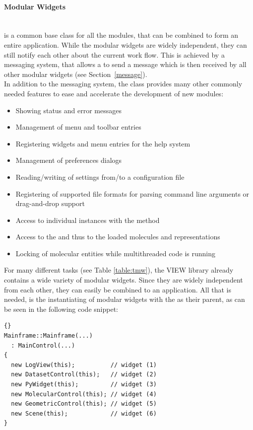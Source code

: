 \paragraph{Modular Widgets}
\hspace*{\fill}\\
 is a common base class for all the modules, that can be
combined to form an entire application. While the modular widgets are widely 
independent, they can still notify each other about the current work flow. 
This is achieved by a messaging system, that allows a 
to send a message which is then received by all other modular widgets (see 
Section~\ref{message}).
\\
In addition to the messaging system, the  class provides 
many other commonly needed features to ease and accelerate the development of
new modules:
\begin{itemize}
  \item Showing status and error messages
  \item Management of menu and toolbar entries 
  \item Registering widgets and menu entries for the help system
  \item Management of preferences dialogs
  \item Reading/writing of settings from/to a configuration file
  \item Registering of supported file formats \eg for parsing command line
        arguments or drag-and-drop support
  \item Access to individual instances with the method 
  \item Access to the  and thus to the loaded molecules and
        representations
  \item Locking of molecular entities while multithreaded code is running
\end{itemize}

For many different tasks (see Table \ref{table:tmw}),
the VIEW library already contains a wide variety of modular widgets.
Since they are widely independent from each other, they can easily
be combined to an application. All that is needed, is the instantiating
of modular widgets with the  as their parent, as can be seen in
the following code snippet:
\begin{lstlisting}{}
Mainframe::Mainframe(...)
  : MainControl(...)
{
  new LogView(this);          // widget (1)
  new DatasetControl(this);   // widget (2)
  new PyWidget(this);         // widget (3)
  new MolecularControl(this); // widget (4)
  new GeometricControl(this); // widget (5)
  new Scene(this);            // widget (6)
}
\end{lstlisting}

